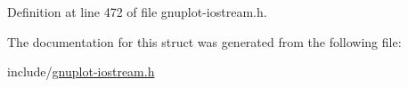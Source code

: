 Definition at line 472 of file gnuplot-\/iostream.\+h.



The documentation for this struct was generated from the following file\+:\begin{DoxyCompactItemize}
\item 
include/\hyperlink{gnuplot-iostream_8h}{gnuplot-\/iostream.\+h}\end{DoxyCompactItemize}
